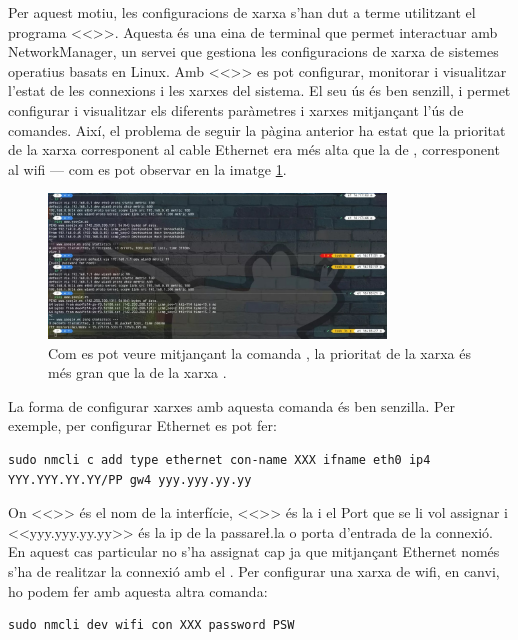 \documentclass{tfgitic}[2022/06/30]
\begin{document}
Per aquest motiu, les configuracions de xarxa s'han dut a terme utilitzant el programa <<>>. Aquesta és una eina de terminal que permet interactuar amb NetworkManager, un servei que gestiona les configuracions de xarxa de sistemes operatius basats en Linux. Amb <<>> es pot configurar, monitorar i visualitzar l'estat de les connexions i les xarxes del sistema. El seu ús és ben senzill, i permet configurar i visualitzar els diferents paràmetres i xarxes mitjançant l'ús de comandes. Així, el problema de seguir la pàgina anterior ha estat que la prioritat de la xarxa  corresponent al cable Ethernet era més alta que la de , corresponent al wifi --- com es pot observar en la imatge \ref{image:ipr}.

\begin{figure}[h]
\centering
\includegraphics[width=0.8\textwidth]{img/changeInterfaceMetric.jpg}
\caption{Com es pot veure mitjançant la comanda , la prioritat de la xarxa  és més gran que la de la xarxa .}
\label{image:ipr}
\end{figure}

La forma de configurar xarxes amb aquesta comanda és ben senzilla. Per exemple, per configurar Ethernet es pot fer:

\begin{lstlisting}[style = bash]
sudo nmcli c add type ethernet con-name XXX ifname eth0 ip4 YYY.YYY.YY.YY/PP gw4 yyy.yyy.yy.yy
\end{lstlisting}

On <<>> és el nom de la interfície, <<>> és la  i el Port que se li vol assignar i <<yyy.yyy.yy.yy>> és la ip de la passare\l.la o porta d'entrada de la connexió. En aquest cas particular no s'ha assignat cap  ja que mitjançant Ethernet només s'ha de realitzar la connexió amb el . Per configurar una xarxa de wifi, en canvi, ho podem fer amb aquesta altra comanda:

\begin{lstlisting}[style = bash]
sudo nmcli dev wifi con XXX password PSW
\end{lstlisting}
\end{document}
